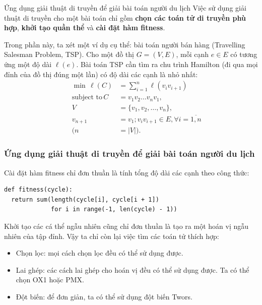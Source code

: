 \begin{frame}{Ứng dụng giải thuật di truyền để giải bài toán người du lịch}
  Việc sử dụng giải thuật di truyền cho một bài toán chỉ gồm \textbf{chọn các
  toán tử di truyền phù hợp}, \textbf{khởi tạo quần thể}  và \textbf{cài đặt hàm
  fitness}.

  Trong phần này, ta xét một ví dụ cụ thể: bài toán người bán hàng (Travelling
  Salesman Problem, TSP). Cho một đồ thị \( G = (V, E) \), mỗi cạnh \( e \in E \) có
  tương ứng một độ dài \( \ell(e) \). Bài toán TSP cần tìm ra chu trình
  Hamilton (đi qua mọi đỉnh của đồ thị đúng một lần) có độ dài các cạnh là nhỏ
  nhất:
  \[
\begin{aligned}
  &&\min\, \ell(C) &= \sum_{i = 1}^{n} \ell(v_{i}v_{i+1})\\
  &&\text{subject to}\, C &= v_{1}v_{2}\ldots v_{n}v_{1},\\
  &&{} V &= \{v_{1}, v_{2}, \ldots , v_{n}\}, \\
  &&{} v_{n+1} &= v_{1}; v_{i}v_{i + 1} \in E, \forall i=\overline{1,n}\\
  && (n &= |V|)
.\end{aligned}
  \] 
\end{frame}

\begin{frame}[fragile]
\frametitle{Ứng dụng giải thuật di truyền để giải bài toán người du lịch}
  Cài đặt hàm fitness chỉ đơn thuần là tính tổng độ dài các cạnh theo công thức:
  \begin{verbatim}
def fitness(cycle):
  return sum(length(cycle[i], cycle[i + 1])
             for i in range(-1, len(cycle) - 1))
  \end{verbatim}

  Khởi tạo các cá thể ngẫu nhiên cũng chỉ đơn thuần là tạo ra một hoán vị ngẫu
  nhiên của tập đỉnh. Vậy ta chỉ còn lại việc tìm các toán tử thích hợp:

  \begin{itemize}
  \item Chọn lọc: mọi cách chọn lọc đều có thể sử dụng được.
  \item Lai ghép: các cách lai ghép cho hoán vị đều có thể sử dụng được. Ta có
    thể chọn OX1 hoặc PMX.
  \item Đột biến: để đơn giản, ta có thể sử dụng đột biến Twors.
  \end{itemize}
\end{frame}

